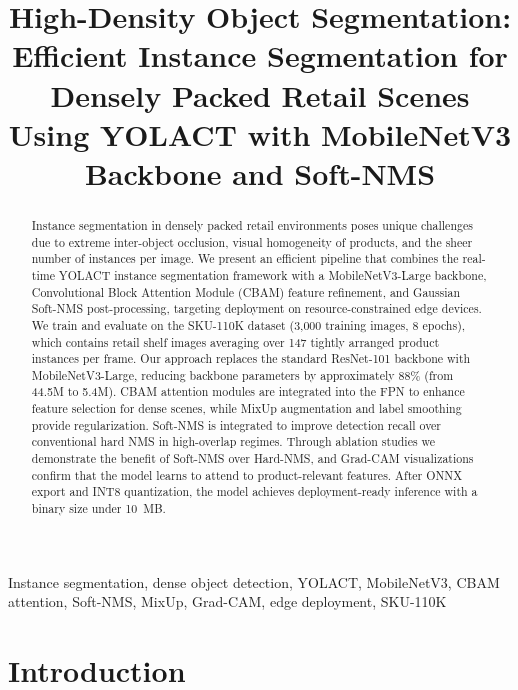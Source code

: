 \documentclass[conference]{IEEEtran}
\title{High-Density Object Segmentation: Efficient Instance Segmentation
       for Densely Packed Retail Scenes Using YOLACT with MobileNetV3
       Backbone and Soft-NMS}
\author{
  \IEEEauthorblockN{Raman Luhach}
  \IEEEauthorblockA{
    Enrollment No: 230107\\
    Department of Computer Science
  }
  \and
  \IEEEauthorblockN{Rachit Kumar}
  \IEEEauthorblockA{
    Enrollment No: 230128\\
    Department of Computer Science
  }
}
\begin{document}
\maketitle

\begin{abstract}
Instance segmentation in densely packed retail environments poses unique
challenges due to extreme inter-object occlusion, visual homogeneity of
products, and the sheer number of instances per image. We present an
efficient pipeline that combines the real-time YOLACT instance segmentation
framework with a MobileNetV3-Large backbone, Convolutional Block Attention
Module (CBAM) feature refinement, and Gaussian Soft-NMS post-processing,
targeting deployment on resource-constrained edge devices. We train and
evaluate on the SKU-110K dataset (3,000 training images, 8 epochs),
which contains retail shelf images averaging over 147 tightly arranged
product instances per frame. Our approach replaces the standard ResNet-101
backbone with MobileNetV3-Large, reducing backbone parameters by
approximately 88\% (from 44.5M to 5.4M). CBAM attention modules are
integrated into the FPN to enhance feature selection for dense scenes,
while MixUp augmentation and label smoothing provide regularization.
Soft-NMS is integrated to improve detection recall over conventional hard
NMS in high-overlap regimes. Through ablation studies we demonstrate the
benefit of Soft-NMS over Hard-NMS, and Grad-CAM visualizations confirm
that the model learns to attend to product-relevant features. After ONNX
export and INT8 quantization, the model achieves deployment-ready
inference with a binary size under 10~MB.
\end{abstract}

\begin{IEEEkeywords}
Instance segmentation, dense object detection, YOLACT, MobileNetV3,
CBAM attention, Soft-NMS, MixUp, Grad-CAM, edge deployment, SKU-110K
\end{IEEEkeywords}

\section{Introduction}
\label{sec:intro}
\end{document}
